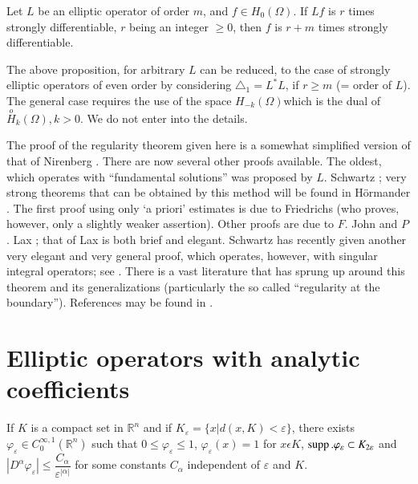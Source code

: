 \begin{proposition}\label{chap3:sec7:prop5} %
  Let $L$ be an elliptic operator of order $m$, and $ f \in H_0
  (\Omega )$. If $Lf$ is $r$ times strongly differentiable, $r$ being
  an integer $\geq 0$, then $f$ is $r + m$ times strongly
  differentiable. 
\end{proposition}

The above proposition, for arbitrary $L$ can be reduced, to the case
of strongly elliptic operators of even order by considering
$\triangle_1 = L^* L$, if $r \geq m$ (= order of $L$). The general
case requires the use of the space $H_{-k} (\Omega)$\pageoriginale which is the
dual of $\overset{o}{H}_k (\Omega ), k > 0$. We do not enter into the
details. 

The proof of the regularity theorem given here is a somewhat
simplified version of that of Nirenberg \cite{32}. There are now several
other proofs available. The oldest, which operates with ``fundamental
solutions'' was proposed by $L$. Schwartz \cite{39}; very strong theorems
that can be obtained by this method will be found in H\"ormander
\cite{17}. The first proof using only `a priori' estimates is due to
Friedrichs \cite{10} (who proves, however, only a slightly weaker
assertion). Other proofs are due to $F$. John \cite{19} and $P$. Lax
\cite{24} ; that of Lax is both brief and elegant. Schwartz has recently
given another very elegant and very general proof, which operates,
however, with singular integral operators; see \cite{40a}. There is a
vast literature that has sprung up around this theorem and its
generalizations (particularly the so called ``regularity at the
boundary''). References may be found in \cite{1}. 

\section{Elliptic operators with analytic coefficients}\label{chap3:sec8}

\setcounter{lemma}{0}
\begin{lemma}\label{chap3:sec8:lem1} %
  If $K$ is a compact set in $\mathbb{R}^n$ and if $K_ \varepsilon =
  \{x | d (x, K) < \varepsilon\}$, there exists $\varphi_ \varepsilon
  \in C^{\infty, 1}_0 (\mathbb{R}^n)$ such that $ 0 \leq \varphi_
  \varepsilon \leq 1$, $\varphi_ \varepsilon (x) = 1$ for $x
  \epsilon K$, $\operatorname{supp}. \varphi_ \varepsilon \subset K_{2
    \varepsilon} $ and $| D^\alpha \varphi_ \varepsilon | \leq
  \dfrac{C_\alpha}{\varepsilon^{| \alpha |}}$ for some constants
  $C_\alpha $ independent of $\varepsilon$ and $K$. 
\end{lemma}

